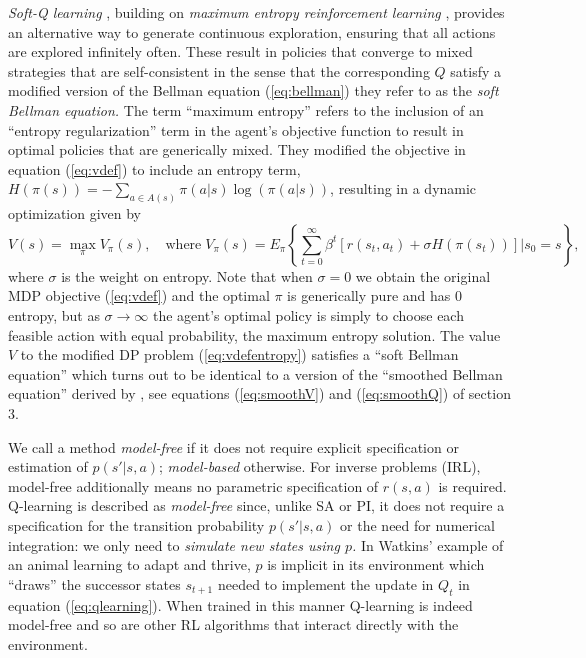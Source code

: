 {\it Soft-Q learning\/} \citep{softqlearning:2017}, building on {\it maximum entropy reinforcement learning\/} \citep{ziebart:2008},
provides an alternative way to generate continuous exploration, ensuring that all actions are
explored infinitely often. These result in policies that converge to mixed strategies that are self-consistent in the 
sense that the corresponding $Q$ satisfy a modified version of the Bellman equation 
(\ref{eq:bellman}) they refer to as the {\it soft Bellman equation.\/} The term ``maximum entropy'' refers to the
inclusion of an ``entropy regularization'' term in the agent's objective function to result in optimal policies
that are generically  mixed. They modified the objective in equation (\ref{eq:vdef}) 
to include an entropy term, $H(\pi(s))=-\sum_{a \in A(s)}\pi(a|s)\log(\pi(a|s))$, resulting in
a dynamic optimization given by
\begin{equation}
       V(s)= \max_\pi  V_\pi(s),  \quad \mbox{where} \;  V_\pi(s) = E_\pi \left\{\sum_{t=0}^\infty \beta^t[r(s_t,a_t)+\sigma H(\pi(s_t))]| s_0=s\right\},
\label{eq:vdefentropy}
\end{equation}
where $\sigma$ is the weight on entropy. Note that when $\sigma=0$ we obtain the original MDP objective
(\ref{eq:vdef}) and the optimal $\pi$ is generically pure and has 0 entropy,
but as $\sigma \to \infty$ the agent's optimal policy is simply to choose each feasible action with
equal probability, the maximum entropy solution.  The value $V$ to the modified DP problem
(\ref{eq:vdefentropy}) satisfies a ``soft Bellman equation'' which  turns out to be identical
to a version of the ``smoothed Bellman equation'' derived by \citet{rust:1988}, 
see equations  (\ref{eq:smoothV}) and (\ref{eq:smoothQ}) of section 3.

We call a method \textit{model-free} if it does not require explicit specification or estimation of $p(s'|s,a)$; \textit{model-based} otherwise. For inverse problems (IRL), model-free additionally means no parametric specification of $r(s,a)$ is required.
Q-learning  is described as {\it model-free\/} since, unlike SA or PI, it does not require a specification for the
transition probability $p(s'|s,a)$ or the need for numerical integration: we only need to {\it simulate new states using $p$.\/} In  Watkins'  example
of an animal learning to adapt and thrive, $p$ is implicit in its environment which ``draws'' the successor states
$s_{t+1}$ needed to implement the update in $Q_t$ in equation (\ref{eq:qlearning}). When trained in this manner Q-learning is indeed model-free
and so are other RL algorithms that interact directly with the environment.

